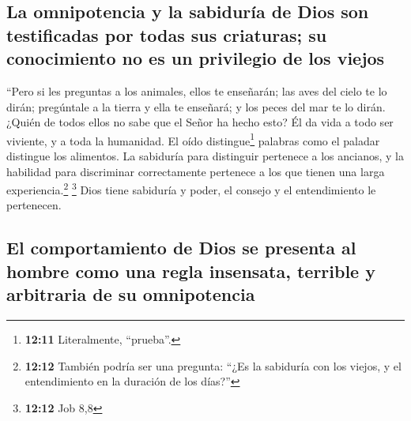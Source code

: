 \hypertarget{la-omnipotencia-y-la-sabiduruxeda-de-dios-son-testificadas-por-todas-sus-criaturas-su-conocimiento-no-es-un-privilegio-de-los-viejos}{%
\subsection{La omnipotencia y la sabiduría de Dios son testificadas por
todas sus criaturas; su conocimiento no es un privilegio de los
viejos}\label{la-omnipotencia-y-la-sabiduruxeda-de-dios-son-testificadas-por-todas-sus-criaturas-su-conocimiento-no-es-un-privilegio-de-los-viejos}}

 ``Pero si les preguntas a los animales, ellos te
enseñarán; las aves del cielo te lo dirán;  pregúntale a
la tierra y ella te enseñará; y los peces del mar te lo dirán.
 ¿Quién de todos ellos no sabe que el Señor ha hecho esto?
 Él da vida a todo ser viviente, y a toda la humanidad.
 El oído distingue\footnote{\textbf{12:11} Literalmente,
  ``prueba''.} palabras como el paladar distingue los alimentos.
 La sabiduría para distinguir pertenece a los ancianos, y
la habilidad para discriminar correctamente pertenece a los que tienen
una larga experiencia.\footnote{\textbf{12:12} También podría ser una
  pregunta: ``¿Es la sabiduría con los viejos, y el entendimiento en la
  duración de los días?''} \footnote{\textbf{12:12} Job 8,8}
 Dios tiene sabiduría y poder, el consejo y el
entendimiento le pertenecen.

\hypertarget{el-comportamiento-de-dios-se-presenta-al-hombre-como-una-regla-insensata-terrible-y-arbitraria-de-su-omnipotencia}{%
\subsection{El comportamiento de Dios se presenta al hombre como una
regla insensata, terrible y arbitraria de su
omnipotencia}\label{el-comportamiento-de-dios-se-presenta-al-hombre-como-una-regla-insensata-terrible-y-arbitraria-de-su-omnipotencia}}

